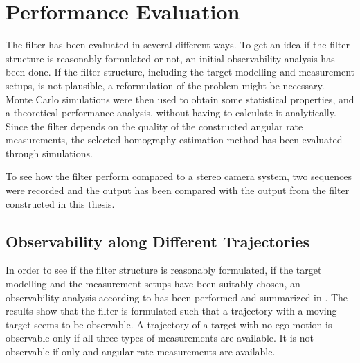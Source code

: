 \chapter{Performance Evaluation}
\label{cha:result}
The filter has been evaluated in several different ways.
To get an idea if the filter structure is reasonably formulated or not, an initial observability analysis has been done.
If the filter structure, including the target modelling and measurement setups, is not plausible, a reformulation of the problem might be necessary.
Monte Carlo simulations were then used to obtain some statistical properties, and a theoretical performance analysis, without having to calculate it analytically.
Since the filter depends on the quality of the constructed angular rate measurements, the selected homography estimation method has been evaluated through simulations.

To see how the filter perform compared to a stereo camera system, two sequences were recorded and the output has been compared with the output from the filter constructed in this thesis.

\section{Observability along Different Trajectories}
\label{sec:observabilityresult}
In order to see if the filter structure is reasonably formulated, \ie if the target modelling and the measurement setups have been suitably chosen, an observability analysis according to  has been performed and summarized in .
The results show that the filter is formulated such that a trajectory with a moving target seems to be observable.
A trajectory of a target with no ego motion is observable only if all three types of measurements are available.
It is not observable if only \abbrROI and angular rate measurements are available.

